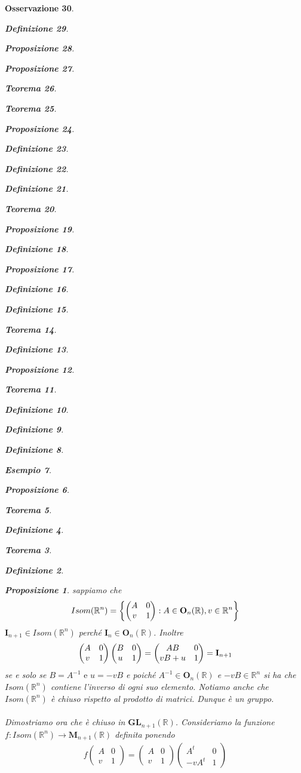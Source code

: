 \documentclass[oneside, 11pt]{amsbook}
\makeatletter
\newcommand{\0}{{(0)}}
\newcommand{\3}{{(3)}}
\theoremstyle{colonplain}
\newtheorem{thm}{Teorema}[chapter]
\newtheorem{prop}[thm]{Proposizione}
\theoremstyle{colondefinition}
\newtheorem{defn}[thm]{Definizione}
\newtheorem{ex}[thm]{Esempio}
\theoremstyle{colonremark}
\newtheorem{rmk}[thm]{Osservazione}
\numberwithin{equation}{chapter}
\renewcommand{\proofname}{Dimostrazione}
\renewenvironment{proof}[1][\proofname]{\par
  \pushQED{\end{proof}}%
  \normalfont \topsep6\p@\@plus6\p@\relax
  \trivlist
  \item[\hskip\labelsep\bfseries #1:]\ignorespaces
}{%
  \popQED\endtrivlist\@endpefalse
}
\makeatother
\begin{document}
\begin{rmk}
\begin{defn}
\begin{prop}
\begin{prop}
\begin{thm}
\begin{thm}
\begin{prop}
\begin{defn}
\begin{defn}
\begin{defn}
\begin{thm}
\begin{prop}
\begin{defn}
\begin{prop}
\begin{defn}
\begin{defn}
\begin{thm}
\begin{defn}
\begin{prop}
\begin{thm}
\begin{defn}
\begin{defn}
\begin{defn}
\begin{ex}
\begin{prop}
\begin{thm}
\begin{defn}
\begin{thm}
\begin{defn}
\begin{prop}
\begin{proof}
\begin{proof}
\begin{proof}
\begin{proof}
\begin{proof}[Soluzione]
\begin{proof}
\begin{proof}
\begin{proof} sappiamo che
\begin{align}
    Isom(\mathbb{R}^n) = \left\{ \begin{pmatrix}
        A & 0 \\
        v & 1
    \end{pmatrix} : A \in \mathbf{O}_n(\mathbb{R}), v \in \mathbb{R}^n \right\} \notag
\end{align}
$\mathbf{I}_{n + 1} \in Isom(\mathbb{R}^n)$ perché $\mathbf{I}_n \in \mathbf{O}_n(\mathbb{R})$. Inoltre
\begin{align}
    \begin{pmatrix}
        A & 0 \\
        v & 1
    \end{pmatrix}
    \begin{pmatrix}
        B & 0 \\
        u & 1
    \end{pmatrix} =
    \begin{pmatrix}
        AB & 0 \\
        vB + u & 1
    \end{pmatrix} =
    \mathbf{I}_{n + 1} \notag
\end{align}
se e solo se $B = A^{-1} \text{ e } u = -vB$ e poiché $A^{-1} \in \mathbf{O}_n(\mathbb{R})$ e $-vB \in \mathbb{R}^n$ si ha che $Isom(\mathbb{R}^n)$ contiene l'inverso di ogni suo elemento. Notiamo anche che $Isom(\mathbb{R}^n)$ è chiuso rispetto al prodotto di matrici. Dunque è un gruppo. \\ \\
Dimostriamo ora che è chiuso in $\mathbf{GL}_{n + 1}(\mathbb{R})$. Consideriamo la funzione \\
$f : Isom(\mathbb{R}^n) \longrightarrow \mathbf{M}_{n + 1}(\mathbb{R})$ definita ponendo
\begin{align}
    f \begin{pmatrix}
        A & 0 \\
        v & 1
    \end{pmatrix} =
    \begin{pmatrix}
        A & 0 \\
        v & 1
    \end{pmatrix}
    \begin{pmatrix}
        A^t & 0 \\
        -vA^t & 1

\end{pmatrix}
\end{align}
\end{proof}
\end{proof}
\end{proof}
\end{proof}
\end{proof}
\end{proof}
\end{proof}
\end{proof}
\end{prop}
\end{defn}
\end{thm}
\end{defn}
\end{thm}
\end{prop}
\end{ex}
\end{defn}
\end{defn}
\end{defn}
\end{thm}
\end{prop}
\end{defn}
\end{thm}
\end{defn}
\end{defn}
\end{prop}
\end{defn}
\end{prop}
\end{thm}
\end{defn}
\end{defn}
\end{defn}
\end{prop}
\end{thm}
\end{thm}
\end{prop}
\end{prop}
\end{defn}
\end{rmk}
\end{document}
